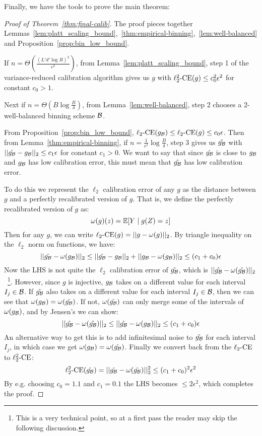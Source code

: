 Finally, we have the tools to prove the main theorem:

\begin{proof}[Proof of Theorem~\ref{thm:final-calib}]
The proof pieces together Lemmas~\ref{lem:platt_scaling_bound},~\ref{thm:empirical-binning},~\ref{lem:well-balanced} and Proposition~\ref{prop:bin_low_bound}.

If $n = \Theta(\frac{(L'd'\log{R})^2}{\epsilon^2})$, from Lemma~\ref{lem:platt_scaling_bound}, step 1 of the variance-reduced calibration algorithm gives us $g$ with $\ell_2^2\mbox{-CE}(g) \leq c_0^2 \epsilon^2$ for constant $c_0 > 1$.

Next if $n = \Theta(B \log{\frac{B}{\delta}})$, from Lemma~\ref{lem:well-balanced}, step 2 chooses a 2-well-balanced binning scheme $\mathcal{B}{}$.

From Proposition~\ref{prop:bin_low_bound}, $\ell_2\mbox{-CE}(g_{\mathcal{B}{}}) \leq \ell_2\mbox{-CE}(g) \leq c_0 \epsilon$. Then from Lemma~\ref{thm:empirical-binning}, if $n = \frac{1}{\epsilon^2} \log{\frac{B}{\delta}}$, step 3 gives us $\hat{g_{\mathcal{B}{}}}$ with $||\hat{g_{\mathcal{B}{}}} - g_{\mathcal{B}{}}||_2 \leq c_1 \epsilon$ for constant $c_1 > 0$. We want to say that since $\hat{g_{\mathcal{B}{}}}$ is close to $g_{\mathcal{B}{}}$ and $g_{\mathcal{B}{}}$ has low calibration error, this must mean that $\hat{g_{\mathcal{B}{}}}$ has low calibration error.

To do this we represent the $\ell_2$ calibration error of any $g$ as the distance between $g$ and a perfectly recalibrated version of $g$. That is, we define the perfectly recalibrated version of $g$ as:
\[ \omega(g)(z) = \mathbb{E}[ Y \mid g(Z) = z ] \]
Then for any $g$, we can write $\ell_2\mbox{-CE}(g) = ||g - \omega(g)||_2$. By triangle inequality on the $\ell_2$ norm on functions, we have:
\[ ||\hat{g_{\mathcal{B}{}}} - \omega(g_{\mathcal{B}{}})||_2 \leq ||\hat{g_{\mathcal{B}{}}} - g_{\mathcal{B}{}}||_2 + ||g_{\mathcal{B}{}} - \omega(g_{\mathcal{B}{}})||_2 \leq (c_1 + c_0)\epsilon \]
Now the LHS is not quite the $\ell_2$ calibration error of $\hat{g_{\mathcal{B}{}}}$, which is $||\hat{g_{\mathcal{B}{}}} - \omega(\hat{g_{\mathcal{B}{}}})||_2$~\footnote{This is a very technical point, so at a first pass the reader may skip the following discussion.}.
However, since $g$ is injective, $g_{\mathcal{B}{}}$ takes on a different value for each interval $I_j \in \mathcal{B}{}$.
If $\hat{g_{\mathcal{B}{}}}$ also takes on a different value for each interval $I_j \in \mathcal{B}{}$, then we can see that $\omega(g_{\mathcal{B}{}}) = \omega(\hat{g_{\mathcal{B}{}}})$.
If not, $\omega(\hat{g_{\mathcal{B}{}}})$ can only merge some of the intervals of $\omega(g_{\mathcal{B}{}})$, and by Jensen's we can show:
\[ ||\hat{g_{\mathcal{B}{}}} - \omega(\hat{g_{\mathcal{B}{}}})||_2 \leq ||\hat{g_{\mathcal{B}{}}} - \omega(g_{\mathcal{B}{}})||_2 \leq (c_1 + c_0)\epsilon \]
An alternative way to get this is to add infinitesimal noise to $\hat{g_{\mathcal{B}{}}}$ for each interval $I_j$, in which case we get $\omega(g_{\mathcal{B}{}}) = \omega(\hat{g_{\mathcal{B}{}}})$.
Finally we convert back from the $\ell_2\mbox{-CE}$ to $\ell_2^2\mbox{-CE}$:
\[ \ell_2^2\mbox{-CE}(\hat{g_{\mathcal{B}{}}}) = ||\hat{g_{\mathcal{B}{}}} - \omega(\hat{g_{\mathcal{B}{}}})||_2^2 \leq (c_1 + c_0)^2 \epsilon^2 \]
By e.g. choosing $c_0 = 1.1$ and $c_1 = 0.1$ the LHS becomes $\leq 2\epsilon^2$, which completes the proof.


\end{proof}

